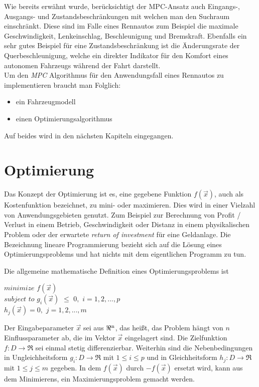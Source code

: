 \documentclass{like}
\begin{document}
Wie bereits erwähnt wurde, berücksichtigt der \ac{MPC}-Ansatz auch Eingangs-, Ausgangs- und Zustandsbeschränkungen mit welchen man den Suchraum einschränkt. Diese sind im Falle eines Rennautos zum Beispiel die maximale Geschwindigkeit, Lenkeinschlag, Beschleunigung und Bremskraft. Ebenfalls ein sehr gutes Beispiel für eine Zustandsbeschränkung ist die Änderungsrate der Querbeschleunigung, welche ein direkter Indikator für den Komfort eines autonomen Fahrzeugs während der Fahrt darstellt.\\

Um den \textit{\acl{MPC}} Algorithmus für den Anwendungsfall eines Rennautos zu implementieren braucht man Folglich:
\begin{itemize}
	\item ein Fahrzeugmodell
	\item einen Optimierungsalgorithmus 
\end{itemize}
Auf beides wird in den nächsten Kapiteln eingegangen.







\section{Optimierung}
Das Konzept der Optimierung ist es, eine gegebene Funktion \(f(\vec{x})\), auch als Kostenfunktion bezeichnet, zu mini- oder maximieren. 
Dies wird in einer Vielzahl von Anwendungsgebieten genutzt.
Zum Beispiel zur Berechnung von Profit / Verlust in einem Betrieb, Geschwindigkeit oder Distanz in einem physikalischen Problem oder der erwartete \textit{return of investment} für eine Geldanlage.  
Die Bezeichnung lineare Programmierung bezieht sich auf die Lösung eines  Optimierungsproblems und hat nichts mit dem eigentlichen Programm zu tun.

Die allgemeine mathematische Definition eines Optimierungsproblems ist

$minimize$  
\noindent\hspace*{3mm}%
$f(\vec{x}) $ \\
$subject$  $to$ 
\noindent\hspace*{3mm}%
$g_i(\vec{x})$ $\leq$ $0,$ $i=1,2,...,p$  \\
\noindent\hspace*{22mm}%
$h_j(\vec{x})= 0,$ $j= 1,2,...,m$\\ 
\noindent\hspace*{22mm}%


Der Eingabeparameter $\vec{x}$ sei aus $\Re \textsuperscript{n} $, das heißt, das Problem hängt von \(n\) Einflussparameter ab, die im Vektor $\vec{x}$ eingelagert sind. Die Zielfunktion $f:D \rightarrow \Re $ sei einmal stetig differenzierbar. Weiterhin sind die Nebenbedingungen in Ungleichheitsform $g_i:D \rightarrow \Re$ mit $1\leq i \leq p$ und in Gleichheitsform $h_j:D \rightarrow \Re$ mit $1\leq j \leq m$ gegeben.
In dem \(f(\vec{x})\) durch \(-f(\vec{x})\) ersetzt wird, kann aus dem Minimierens, ein Maximierungsproblem gemacht werden.  
\end{document}

